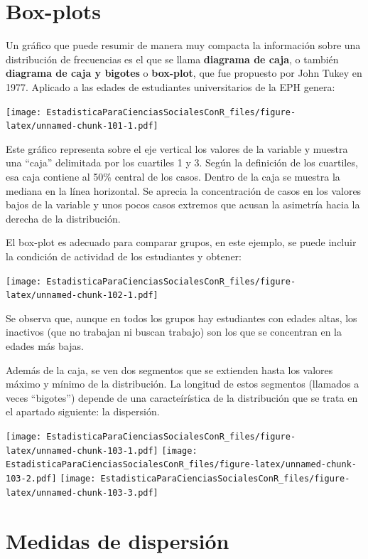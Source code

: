 \documentclass[]{book}
\begin{document}
\hypertarget{box-plots}{%
\section{Box-plots}\label{box-plots}}

Un gráfico que puede resumir de manera muy compacta la información sobre
una distribución de frecuencias es el que se llama \textbf{diagrama de caja},
o también \textbf{diagrama de caja y bigotes} o \textbf{box-plot}, que fue
propuesto por John Tukey en 1977.
Aplicado a las edades de estudiantes universitarios de la EPH genera:

\texttt{[image: EstadisticaParaCienciasSocialesConR\_files/figure-latex/unnamed-chunk-101-1.pdf]}

Este gráfico representa sobre el eje vertical los valores de la variable y muestra una ``caja'' delimitada por los cuartiles 1 y 3. Según la definición de los cuartiles, esa caja contiene al 50\% central de los casos. Dentro de la caja se muestra la mediana en la línea horizontal. Se aprecia la concentración de casos en los valores bajos de la variable y unos pocos casos extremos que acusan la asimetría hacia la derecha de la distribución.

El box-plot es adecuado para comparar grupos, en este ejemplo, se puede incluir la condición de actividad de los estudiantes y obtener:

\texttt{[image: EstadisticaParaCienciasSocialesConR\_files/figure-latex/unnamed-chunk-102-1.pdf]}

Se observa que, aunque en todos los grupos hay estudiantes con edades altas, los inactivos (que no trabajan ni buscan trabajo) son los que se concentran en la edades más bajas.

Además de la caja, se ven dos segmentos que se extienden hasta los
valores máximo y mínimo de la distribución. La longitud de estos segmentos (llamados a veces ``bigotes'') depende de una caracteírística de la distribución que se trata en el apartado siguiente: la
dispersión.

\texttt{[image: EstadisticaParaCienciasSocialesConR\_files/figure-latex/unnamed-chunk-103-1.pdf]} \texttt{[image: EstadisticaParaCienciasSocialesConR\_files/figure-latex/unnamed-chunk-103-2.pdf]} \texttt{[image: EstadisticaParaCienciasSocialesConR\_files/figure-latex/unnamed-chunk-103-3.pdf]}

\hypertarget{medidas-de-dispersiuxf3n}{%
\section{Medidas de dispersión}\label{medidas-de-dispersiuxf3n}}
\end{document}
